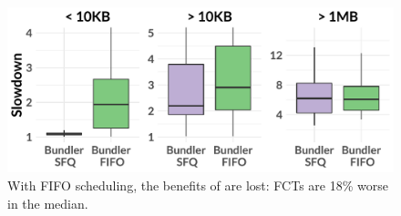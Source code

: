 \begin{figure}
    \centering
\begin{knitrout}
\color{fgcolor}
\includegraphics[width=\maxwidth]{figure/eval:fifo-1} 

\end{knitrout}
    \caption{With FIFO scheduling, the benefits of \name are lost: FCTs are 18\% worse in the median.}
    \label{fig:eval:fifo}
\end{figure}
